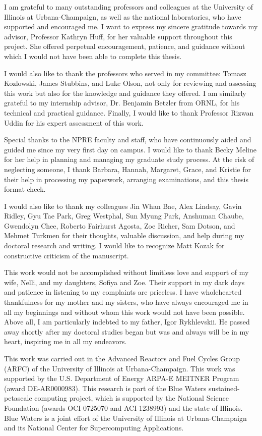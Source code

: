 I am grateful to many outstanding professors and colleagues at the 
University of Illinois at Urbana-Champaign, as well as the national 
laboratories, who have supported and encouraged me. I want to express my 
sincere gratitude towards my advisor, Professor Kathryn Huff,
for her valuable support throughout this project. She offered perpetual 
encouragement, patience, and guidance without which I would not have been able 
to complete this thesis. 

I would also like to thank the professors who served in my committee: Tomasz 
Kozlowski, James Stubbins, and Luke Olson, not only for reviewing and 
assessing this work but also for the knowledge and guidance they offered. I 
am similarly grateful to my internship advisor, Dr. Benjamin Betzler from 
ORNL, for his technical and practical guidance. Finally, I would like to thank 
Professor Rizwan Uddin for his expert assessment of this work.

Special thanks to the NPRE faculty and staff, who have continuously aided and 
guided me since my very first day on campus. I would like to thank Becky 
Meline for her help in planning and managing my graduate study process. At the 
risk of neglecting someone, I thank Barbara, Hannah, Margaret, Grace, and 
Kristie for their help in processing my paperwork, arranging examinations, and 
this thesis format check. 

I would also like to thank my colleagues Jin Whan Bae, Alex Lindsay, Gavin 
Ridley, Gyu Tae Park, Greg Westphal, Sun Myung Park, Anshuman Chaube, 
Gwendolyn Chee, Roberto Fairhurst Agosta, Zoe Richer, Sam Dotson, and Mehmet 
Turkmen for their thoughts, valuable discussion, and help during my doctoral 
research and writing. I would like to recognize Matt Kozak for constructive 
criticism of the manuscript. 

This work would not be accomplished without limitless love and support of my 
wife, Nelli, and my daughters, Sofiya and Zoe. Their support in my dark days 
and patience in listening to my complaints are priceless. I have wholehearted 
thankfulness for my mother and my sisters, who have always encouraged me in 
all my beginnings and without whom this work would not have been possible. 
Above all, I am particularly indebted to my father, Igor Rykhlevskii. He 
passed away shortly after my doctoral studies began but was and always will be 
in my heart, inspiring me in all my endeavors.

This work was carried out in the Advanced Reactors and Fuel Cycles Group 
(ARFC) of the University of Illinois at Urbana-Champaign. This work was 
supported by the U.S. Department of Energy ARPA-E MEITNER Program (award 
DE-AR0000983). This research is part of the Blue Waters sustained-petascale 
computing project, which is supported by the National Science Foundation 
(awards OCI-0725070 and ACI-1238993) and the state of Illinois. Blue Waters is 
a joint effort of the University of Illinois at Urbana-Champaign and its 
National Center for Supercomputing Applications.